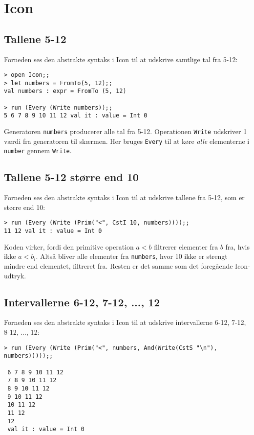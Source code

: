 \section{Icon}

\subsection{Tallene 5-12}

Forneden ses den abstrakte syntaks i Icon til at udskrive samtlige tal fra 5-12:

\begin{verbatim}
> open Icon;;
> let numbers = FromTo(5, 12);;
val numbers : expr = FromTo (5, 12)

> run (Every (Write numbers));;
5 6 7 8 9 10 11 12 val it : value = Int 0
\end{verbatim}

Generatoren \texttt{numbers} producerer alle tal fra 5-12. Operationen \texttt{Write} udskriver 1 værdi fra generatoren til skærmen. Her bruges \texttt{Every} til at køre \textit{alle} elementerne i \texttt{number} gennem \texttt{Write}.

\subsection{Tallene 5-12 større end 10}

Forneden ses den abstrakte syntaks i Icon til at udskrive tallene fra 5-12, som er større end 10:

\begin{verbatim}
> run (Every (Write (Prim("<", CstI 10, numbers))));;
11 12 val it : value = Int 0
\end{verbatim}

Koden virker, fordi den primitive operation $a < b$ filtrerer elementer fra $b$ fra, hvis ikke $a < b_i$. Altså bliver alle elementer fra \texttt{numbers}, hvor 10 ikke er strengt mindre end elementet, filtreret fra. Resten er det samme som det foregående Icon-udtryk.

\subsection{Intervallerne 6-12, 7-12, ..., 12}

Forneden ses den abstrakte syntaks i Icon til at udskrive intervallerne 6-12, 7-12, 8-12, ..., 12:

\begin{verbatim}
> run (Every (Write (Prim("<", numbers, And(Write(CstS "\n"), numbers)))));;

 6 7 8 9 10 11 12
 7 8 9 10 11 12
 8 9 10 11 12
 9 10 11 12
 10 11 12
 11 12
 12
 val it : value = Int 0
\end{verbatim}

